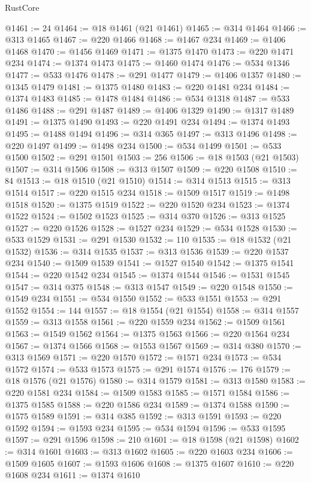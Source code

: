 \begin{lexlean}{RustCore}
\begin{coremodule}
@1461 := 24
@1464 := @18 @1461 (@21 @1461)
@1465 := @314 @1464
@1466 := @313 @1465
@1467 := @220 @1466
@1468 := @1467 @234
@1469 := @1406 @1468
@1470 := @1456 @1469
@1471 := @1375 @1470
@1473 := @220 @1471 @234
@1474 := @1374 @1473
@1475 := @1460 @1474
@1476 := @534 @1346
@1477 := @533 @1476
@1478 := @291 @1477
@1479 := @1406 @1357
@1480 := @1345 @1479
@1481 := @1375 @1480
@1483 := @220 @1481 @234
@1484 := @1374 @1483
@1485 := @1478 @1484
@1486 := @534 @1318
@1487 := @533 @1486
@1488 := @291 @1487
@1489 := @1406 @1329
@1490 := @1317 @1489
@1491 := @1375 @1490
@1493 := @220 @1491 @234
@1494 := @1374 @1493
@1495 := @1488 @1494
@1496 := @314 @365
@1497 := @313 @1496
@1498 := @220 @1497
@1499 := @1498 @234
@1500 := @534 @1499
@1501 := @533 @1500
@1502 := @291 @1501
@1503 := 256
@1506 := @18 @1503 (@21 @1503)
@1507 := @314 @1506
@1508 := @313 @1507
@1509 := @220 @1508
@1510 := 84
@1513 := @18 @1510 (@21 @1510)
@1514 := @314 @1513
@1515 := @313 @1514
@1517 := @220 @1515 @234
@1518 := @1509 @1517
@1519 := @1498 @1518
@1520 := @1375 @1519
@1522 := @220 @1520 @234
@1523 := @1374 @1522
@1524 := @1502 @1523
@1525 := @314 @370
@1526 := @313 @1525
@1527 := @220 @1526
@1528 := @1527 @234
@1529 := @534 @1528
@1530 := @533 @1529
@1531 := @291 @1530
@1532 := 110
@1535 := @18 @1532 (@21 @1532)
@1536 := @314 @1535
@1537 := @313 @1536
@1539 := @220 @1537 @234
@1540 := @1509 @1539
@1541 := @1527 @1540
@1542 := @1375 @1541
@1544 := @220 @1542 @234
@1545 := @1374 @1544
@1546 := @1531 @1545
@1547 := @314 @375
@1548 := @313 @1547
@1549 := @220 @1548
@1550 := @1549 @234
@1551 := @534 @1550
@1552 := @533 @1551
@1553 := @291 @1552
@1554 := 144
@1557 := @18 @1554 (@21 @1554)
@1558 := @314 @1557
@1559 := @313 @1558
@1561 := @220 @1559 @234
@1562 := @1509 @1561
@1563 := @1549 @1562
@1564 := @1375 @1563
@1566 := @220 @1564 @234
@1567 := @1374 @1566
@1568 := @1553 @1567
@1569 := @314 @380
@1570 := @313 @1569
@1571 := @220 @1570
@1572 := @1571 @234
@1573 := @534 @1572
@1574 := @533 @1573
@1575 := @291 @1574
@1576 := 176
@1579 := @18 @1576 (@21 @1576)
@1580 := @314 @1579
@1581 := @313 @1580
@1583 := @220 @1581 @234
@1584 := @1509 @1583
@1585 := @1571 @1584
@1586 := @1375 @1585
@1588 := @220 @1586 @234
@1589 := @1374 @1588
@1590 := @1575 @1589
@1591 := @314 @385
@1592 := @313 @1591
@1593 := @220 @1592
@1594 := @1593 @234
@1595 := @534 @1594
@1596 := @533 @1595
@1597 := @291 @1596
@1598 := 210
@1601 := @18 @1598 (@21 @1598)
@1602 := @314 @1601
@1603 := @313 @1602
@1605 := @220 @1603 @234
@1606 := @1509 @1605
@1607 := @1593 @1606
@1608 := @1375 @1607
@1610 := @220 @1608 @234
@1611 := @1374 @1610

\end{coremodule}
\end{lexlean}

